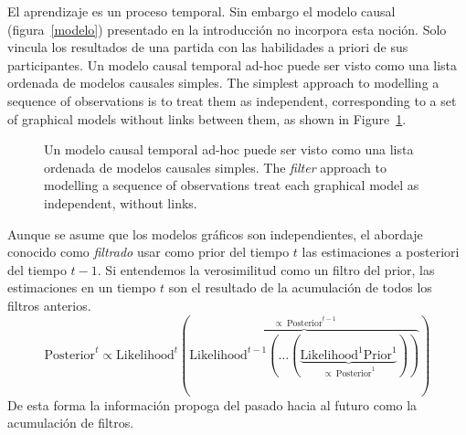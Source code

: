\documentclass[article]{jss}
\begin{document}
El aprendizaje es un proceso temporal.
%
Sin embargo el modelo causal (figura~\ref{modelo}) presentado en la introducci\'on no incorpora esta noci\'on.
%
Solo vincula los resultados de una partida con las habilidades a priori de sus participantes.
%
Un modelo causal temporal ad-hoc puede ser visto como una lista ordenada de modelos causales simples.
%
The simplest approach to modelling a sequence of observations is to treat them as independent, corresponding to a set of graphical models without links between them, as shown in Figure~\ref{fig:filter}.
%
\begin{figure}[h!]
  \centering
  \caption{Un modelo causal temporal ad-hoc puede ser visto como una lista ordenada de modelos causales simples.
  The \emph{filter} approach to modelling a sequence of observations treat each graphical model as independent, without links.}
  \label{fig:filter}
\end{figure}
%
Aunque se asume que los modelos gráficos son independientes, el abordaje conocido como \emph{filtrado} usar como prior del tiempo $t$ las estimaciones a posteriori del tiempo $t-1$.
%
Si entendemos la verosimilitud como un filtro del prior, las estimaciones en un tiempo $t$ son el resultado de la acumulación de todos los filtros anterios.
%
\begin{equation}
 \text{Posterior}^t \propto \text{Likelihood}^t (\overbrace{\text{Likelihood}^{t-1} (\dots (\underbrace{\text{Likelihood}^{1} \text{Prior}^1}_{\propto\ \text{Posterior}^1} ))}^{\propto \ \text{Posterior}^{t-1}} )
\end{equation}
%
De esta forma la información propoga del pasado hacia al futuro como la acumulación de filtros.
\end{document}
